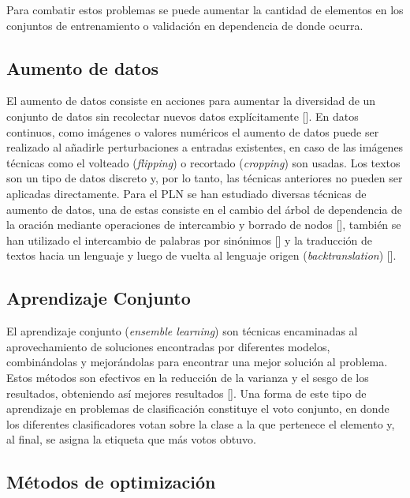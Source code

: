 Para combatir estos problemas se puede aumentar la cantidad de elementos en los conjuntos de entrenamiento o 
validación en dependencia de donde ocurra.

\subsection{Aumento de datos}

El aumento de datos consiste en acciones para aumentar la diversidad de un conjunto de datos sin recolectar
nuevos datos explícitamente [\cite{feng2021data}]. En datos continuos, como imágenes o valores numéricos el 
aumento de datos puede ser realizado al añadirle perturbaciones a entradas existentes, en caso de las imágenes 
técnicas como el volteado (\emph{flipping}) o recortado (\emph{cropping}) son usadas. Los textos son un tipo 
de datos discreto y, por lo tanto, las técnicas anteriores no pueden ser aplicadas directamente. Para el PLN
se han estudiado diversas técnicas de aumento de datos, una de estas consiste en el cambio del árbol de 
dependencia de la oración mediante operaciones de intercambio y borrado de nodos [\cite{csahin2019data}], también se han utilizado 
el intercambio de palabras por sinónimos [\cite{dai2020analysis}] y la traducción de textos hacia un lenguaje y luego 
de vuelta al lenguaje origen (\emph{backtranslation}) [\cite{sennrich2015improving}]. 

\subsection{Aprendizaje Conjunto}

El aprendizaje conjunto (\emph{ensemble learning}) son técnicas encaminadas al aprovechamiento
de soluciones encontradas por diferentes modelos, combinándolas y mejorándolas para encontrar una mejor solución 
al problema. Estos métodos son efectivos en la reducción de la varianza y el sesgo de los resultados, obteniendo así
mejores resultados [\cite{dietterich2002ensemble}]. Una forma de este tipo de aprendizaje en problemas de 
clasificación constituye el voto conjunto, en donde los diferentes clasificadores votan sobre la clase a la que 
pertenece el elemento y, al final, se asigna la etiqueta que más votos obtuvo.

\subsection{Métodos de optimización}

